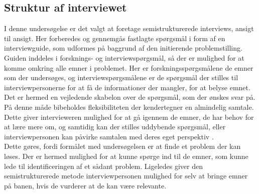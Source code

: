 \subsection {Struktur af interviewet}
I denne undersøgelse er det valgt at foretage semistrukturerede interviews, ansigt til ansigt. Her forberedes og gennemgås fastlagte spørgsmål i form af en interviewguide, som udformes på baggrund af den initierende problemstilling. Guiden inddeles i forsknings- og interviewspørgsmål, så der er mulighed for at komme omkring alle emner i problemet. Her er forskningsspørgsmålene de emner som der undersøges, og interviewspørgsmålene er de spørgsmål der stilles til interviewpersonerne for at få de informationer der mangler, for at belyse emnet. Det er hermed en vejledende skabelon over de spørgsmål, som der ønskes svar på. På denne måde bibeholdes fleksibiliteten der kendertegner en almindelig samtale. Dette giver intervieweren mulighed for at gå igennem de emner, de har behov for at lære mere om, og samtidig kan der stilles uddybende spørgsmål, eller interviewpersonen kan påvirke samtalen med deres eget perspektiv \citep{brinkmann2014}.\\
Dette gøres, fordi formålet med undersøgelsen er at finde et problem der kan løses. Der er hermed mulighed for at kunne spørge ind til de emner, som kunne lede til identificeringen af et sådant problem. Ligeledes giver den semistrukturerede metode interviewpersonen mulighed for selv at bringe emner på banen, hvis de vurderer at de kan være relevante.
\\
